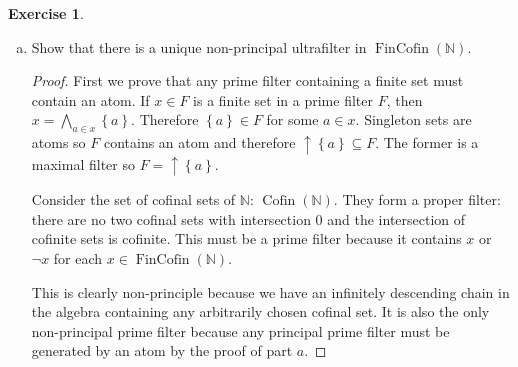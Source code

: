 \documentclass{article}
\newcommand{\N}{\mathbb{N}}
\newcommand{\set}[1]{\left\{#1\right\}}
\renewcommand{\qedsymbol}{\raisebox{-0.5cm}{}}
\DeclareMathOperator{\cofin}{Cofin}
\DeclareMathOperator{\fincofin}{FinCofin}
\newenvironment{solution}{\begin{proof}[Solution]\renewcommand\qedsymbol{}}{\end{proof}}
\theoremstyle{definition}
\newtheorem{question}{Exercise}
\begin{document}
\begin{question}
\begin{enumerate}[a)]
\begin{solution}
                  The atoms are clearly the singleton sets, so these give the
                  prime filters.
              \end{solution}

        \item Show that there is a unique non-principal ultrafilter in
              \(\fincofin(\N)\).

              \begin{proof}
                  First we prove that any prime filter containing a finite set
                  must contain an atom. If \(x\in F\) is a finite set in a prime
                  filter \(F\), then \(x=\bigwedge_{a\in x}\set{a}\). Therefore
                  \(\set{a}\in F\) for some \(a\in x\). Singleton sets are atoms
                  so \(F\) contains an atom and therefore
                  \(\uparrow\set{a}\subseteq F\). The former is a maximal filter
                  so \(F=\uparrow\set{a}\).

                  Consider the set of cofinal sets of \(\N\): \(\cofin(\N)\).
                  They form a proper filter: there are no two cofinal sets with
                  intersection \(0\) and the intersection of cofinite sets is
                  cofinite. This must be a prime filter because it contains
                  \(x\) or \(\neg x\) for each \(x\in\fincofin(\N)\).

                  This is clearly non-principle because we have an infinitely
                  descending chain in the algebra containing any arbitrarily
                  chosen cofinal set. It is also the only non-principal prime
                  filter because any principal prime filter must be generated by
                  an atom by the proof of part \(a\).
              \end{proof}
    \end{enumerate}
\end{question}
\end{document}
